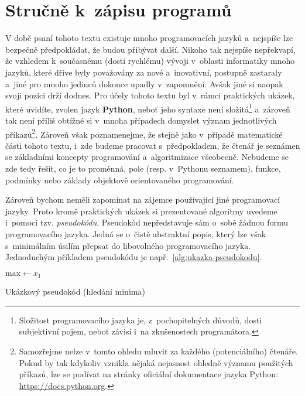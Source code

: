 \section{Stručně k~zápisu programů}\label{sec:zapis-programu}

V době psaní tohoto textu existuje mnoho programovacích jazyků a~nejspíše lze bezpečně předpokládat, že budou přibývat další. Nikoho tak nejspíše nepřekvapí, že vzhledem k~současnému (dosti rychlému) vývoji v~oblasti informatiky mnoho jazyků, které dříve byly považovány za nové a~inovativní, postupně zastaraly a~jiné pro mnoho jedinců dokonce upadly v~zapomnění. Avšak jiné si naopak svoji pozici drží dodnes. Pro účely tohoto textu byl v~rámci praktických ukázek, které uvidíte, zvolen jazyk \textbf{Python}, neboť jeho syntaxe není složitá\footnote{Složitost programovacího jazyka je, z~pochopitelných důvodů, dosti subjektivní pojem, neboť závisí i~na zkušenostech programátora.} a~zároveň tak není příliš obtížné si v~mnoha případech domyslet význam jednotlivých příkazů\footnote{Samozřejme nelze v~tomto ohledu mluvit za každého (potenciálního) čtenáře. Pokud by tak kdykoliv vznikla nějaká nejasnost ohledně významu použitých příkazů, lze se podívat na stránky oficiální dokumentace jazyka Python: \url{https://docs.python.org}.}. Zároveň však poznamenejme, že stejně jako v~případě matematické části tohoto textu, i~zde budeme pracovat s~předpokladem, že čtenář je seznámen se základními koncepty programování a~algoritmizace všeobecně. Nebudeme se zde tedy řešit, co je to proměnná, pole (resp. v~Pythonu seznamem), funkce, podmínky nebo základy objektově orientovaného programování.

Zároveň bychom neměli zapomínat na zájemce používající jiné programovací jazyky. Proto kromě praktických ukázek si prezentované algoritmy uvedeme i~pomocí tzv. \emph{pseudokódu}. Pseudokód nepředstavuje sám o~sobě žádnou formu programovacího jazyka. Jedná se o~čistě abstraktní popis, který lze však s~minimálním úsilím přepsat do libovolného programovacího jazyka. Jednoduchým příkladem pseudokódu je např.~\ref{alg:ukazka-pseudokodu}.
\begin{algorithm}
    $\text{max}\gets x_1$\;
    \caption{Ukázkový pseudokód (hledání minima)}
    \label{alg:ukazka-pseudokodu}
\end{algorithm}

